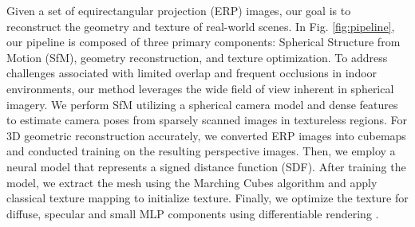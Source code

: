 
Given a set of equirectangular projection (ERP) images, our goal is to reconstruct the geometry and texture of real-world scenes. In Fig. \ref{fig:pipeline}, 
our pipeline is composed of three primary components: Spherical Structure from Motion (SfM), geometry reconstruction, and texture optimization. To address challenges associated with limited overlap and frequent occlusions in indoor environments, our method leverages the wide field of view inherent in spherical imagery. We perform SfM utilizing a spherical camera model and dense features to estimate camera poses from sparsely scanned images in textureless regions. For 3D geometric reconstruction accurately, we converted ERP images into cubemaps and conducted training on the resulting perspective images. Then, we employ a neural model \cite{xiao2024debsdf} that represents a signed distance function (SDF). After training the model, we extract the mesh using the Marching Cubes algorithm \cite{marchingcube} and apply classical texture mapping \cite{waechter2014TexRecon} to initialize texture. Finally, we optimize the texture for diffuse, specular and small MLP components using differentiable rendering \cite{nvdiffrast}.    


